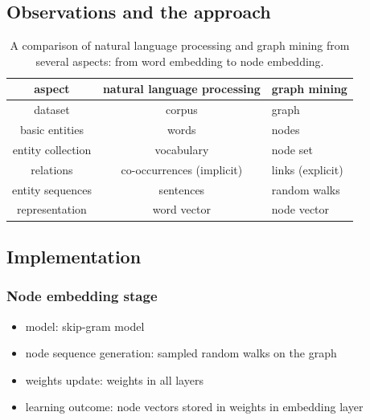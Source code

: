 \documentclass{article}
\begin{document}
\subsection{Observations and the approach}
\begin{table}[H]
	\centering
	\begin{tabularx}{\textwidth}{ |c|c|X| } \hline
		aspect  & natural language processing & graph mining \\ \hline
		dataset & corpus & graph \\ \hline
		basic entities & words & nodes \\ \hline
		entity collection & vocabulary & node set \\ \hline
		relations & co-occurrences (implicit) & links (explicit) \\ \hline
		entity sequences & sentences & random walks \\ \hline
		representation & word vector & node vector \\ \hline
	\end{tabularx}
	\caption{A comparison of natural language processing and graph mining from several aspects: from word embedding to node embedding.}
	\label{tab:wordVSnode}
\end{table}

\subsection{Implementation}

\subsubsection{Node embedding stage}
\begin{itemize}
	\item model: skip-gram model
	\item node sequence generation: sampled random walks on the graph
	\item weights update: weights in all layers
	\item learning outcome: node vectors stored in weights in embedding layer
\end{itemize}
\end{document}
